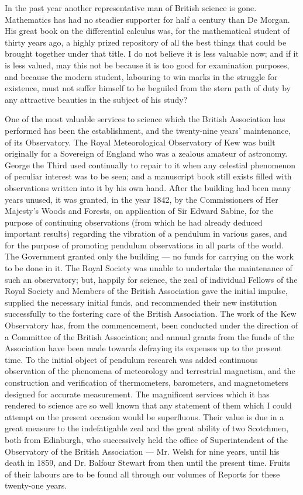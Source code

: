 \documentclass[a4paper, 11pt, oneside, english]{article}
\begin{document}
In the past year another representative man of British science is gone. Mathematics has had no steadier supporter for half a century than De Morgan. His great book on the differential calculus was, for the mathematical student of thirty years ago, a highly prized repository of all the best things that could be brought together under that title. I do not believe it is less valuable now; and if it is less valued, may this not be because it is too good for examination purposes, and because the modern student, labouring to win marks in the struggle for existence, must not suffer himself to be beguiled from the stern path of duty by any attractive beauties in the subject of his study?

One of the most valuable services to science which the British Association has performed has been the establishment, and the twenty-nine years' maintenance, of its Observatory. The Royal Meteorological Observatory of Kew was built originally for a Sovereign of England who was a zealous amateur of astronomy. George the Third used continually to repair to it when any celestial phenomenon of peculiar interest was to be seen; and a manuscript book still exists filled with observations written into it by his own hand. After the building had been many years unused, it was granted, in the year 1842, by the Commissioners of Her Majesty's Woods and Forests, on application of Sir Edward Sabine, for the purpose of continuing observations (from which he had already deduced important results) regarding the vibration of a pendulum in various gases, and for the purpose of promoting pendulum observations in all parts of the world. The Government granted only the building --- no funds for carrying on the work to be done in it. The Royal Society was unable to undertake the maintenance of such an observatory; but, happily for science, the zeal of individual Fellows of the Royal Society and Members of the British Association gave the initial impulse, supplied the necessary initial funds, and recommended their new institution successfully to the fostering care of the British Association. The work of the Kew Observatory has, from the commencement, been conducted under the direction of a Committee of the British Association; and annual grants from the funds of the Association have been made towards defraying its expenses up to the present time. To the initial object of pendulum research was added continuous observation of the phenomena of meteorology and terrestrial magnetism, and the construction and verification of thermometers, barometers, and magnetometers designed for accurate measurement. The magnificent services which it has rendered to science are so well known that any statement of them which I could attempt on the present occasion would be superfluous. Their value is due in a great measure to the indefatigable zeal and the great ability of two Scotchmen, both from Edinburgh, who successively held the office of Superintendent of the Observatory of the British Association --- Mr. Welsh for nine years, until his death in 1859, and Dr. Balfour Stewart from then until the present time. Fruits of their labours are to be found all through our volumes of Reports for these twenty-one years.
\end{document}
